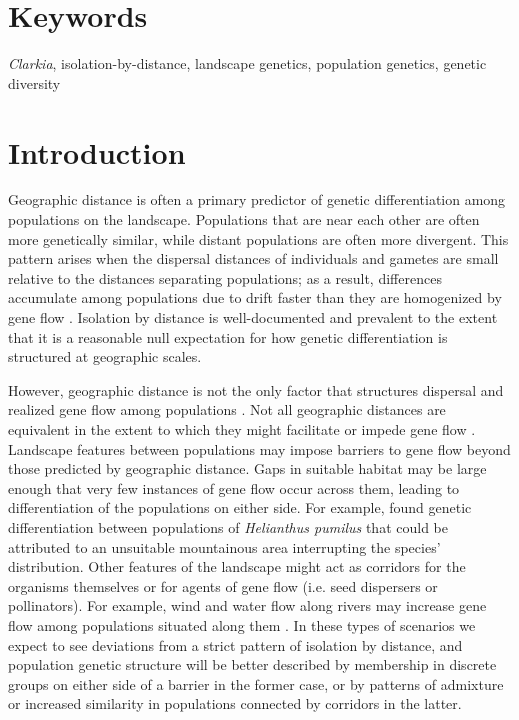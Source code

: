\documentclass{article}
\begin{document}
\section*{Keywords}

\textit{Clarkia}, isolation-by-distance, landscape genetics, population genetics, genetic diversity

\section*{Introduction}

Geographic distance is often a primary predictor of genetic differentiation among populations on the landscape. Populations that are near each other are often more genetically similar, while distant populations are often more divergent. This pattern arises when the dispersal distances of individuals and gametes are small relative to the distances separating populations; as a result, differences accumulate among populations due to drift faster than they are homogenized by gene flow \citep{slatkin1993isolation, wright1943isolation}. Isolation by distance is well-documented and prevalent \citep{sexton2014genetic} to the extent that it is a reasonable null expectation for how genetic differentiation is structured at geographic scales. 

However, geographic distance is not the only factor that structures dispersal and realized gene flow among populations \citep{mcrae2006isolation, epps2005highways}. Not all geographic distances are equivalent in the extent to which they might facilitate or impede gene flow \citep{storfer2007putting}. Landscape features between populations may impose barriers to gene flow beyond those predicted by geographic distance. Gaps in suitable habitat may be large enough that very few instances of gene flow occur across them, leading to differentiation of the populations on either side. For example, \citet{reeves2014effect} found genetic differentiation between populations of \textit{Helianthus pumilus} that could be attributed to an unsuitable mountainous area interrupting the species' distribution. Other features of the landscape might act as corridors for the organisms themselves or for agents of gene flow (i.e. seed dispersers or pollinators). For example, wind and water flow along rivers may increase gene flow among populations situated along them \citep{lee2018population}. In these types of scenarios we expect to see deviations from a strict pattern of isolation by distance, and population genetic structure will be better described by membership in discrete groups on either side of a barrier in the former case, or by patterns of admixture or increased similarity in populations connected by corridors in the latter. 
\end{document}
